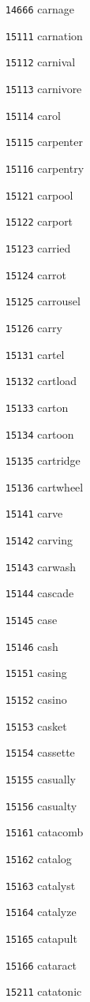 \documentclass[twoside,11pt]{article}
\begin{document}
\begin{multicols}{5}
\begin{enumerate}
\item[\texttt{14666}] carnage
\item[\texttt{15111}] carnation
\item[\texttt{15112}] carnival
\item[\texttt{15113}] carnivore
\item[\texttt{15114}] carol
\item[\texttt{15115}] carpenter
\item[\texttt{15116}] carpentry
\item[\texttt{15121}] carpool
\item[\texttt{15122}] carport
\item[\texttt{15123}] carried
\item[\texttt{15124}] carrot
\item[\texttt{15125}] carrousel
\item[\texttt{15126}] carry
\item[\texttt{15131}] cartel
\item[\texttt{15132}] cartload
\item[\texttt{15133}] carton
\item[\texttt{15134}] cartoon
\item[\texttt{15135}] cartridge
\item[\texttt{15136}] cartwheel
\item[\texttt{15141}] carve
\item[\texttt{15142}] carving
\item[\texttt{15143}] carwash
\item[\texttt{15144}] cascade
\item[\texttt{15145}] case
\item[\texttt{15146}] cash
\item[\texttt{15151}] casing
\item[\texttt{15152}] casino
\item[\texttt{15153}] casket
\item[\texttt{15154}] cassette
\item[\texttt{15155}] casually
\item[\texttt{15156}] casualty
\item[\texttt{15161}] catacomb
\item[\texttt{15162}] catalog
\item[\texttt{15163}] catalyst
\item[\texttt{15164}] catalyze
\item[\texttt{15165}] catapult
\item[\texttt{15166}] cataract
\item[\texttt{15211}] catatonic

\end{enumerate}
\end{multicols}
\end{document}
